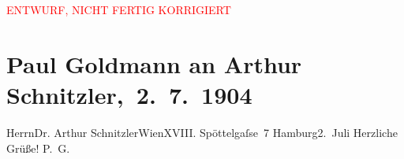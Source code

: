 
\begin{center}
            \textcolor{red}{ENTWURF, NICHT FERTIG KORRIGIERT}
                      \end{center}
            
         \renewcommand{\erwaehnteOrte}{Orte: Edmund-Weiß-Gasse, Hamburg, Wien}
         \renewcommand{\erwaehnteWerke}{}
               \section[ Paul Goldmann an Arthur Schnitzler, 2. 7. 1904]{ Paul Goldmann an Arthur Schnitzler, 2. 7. 1904}\nopagebreak{}\rehead{ }\begin{ledgroupsized}[t]{13cm}\normalsize\beginnumbering \toendnotes[C]{\smallbreak\pagebreak[2]} 
\pstart{}{\pb}Herrn\pend{}\pstart{}Dr. Arthur Schnitzler\pend{}\pstart{}Wien\pend{}\pstart{}XVIII. Spöttelgaſse 7\pend{}{\bigskip}\pstart
           {\pb}Hamburg2. Juli\pend
           \pstart
           Herzliche Grüße!\pend
           \pstart \spacefill\mbox{P. G.}\pend{}
         
         \endnumbering{}\end{ledgroupsized}\begin{anhang}\end{anhang}\newcommand{\dateiname}{L03447}\newcommand{\titel}{Paul Goldmann an Arthur Schnitzler, 2. 7. 1904}\newcommand{\editorInnen}{Martin Anton Müller und Laura Untner}
      